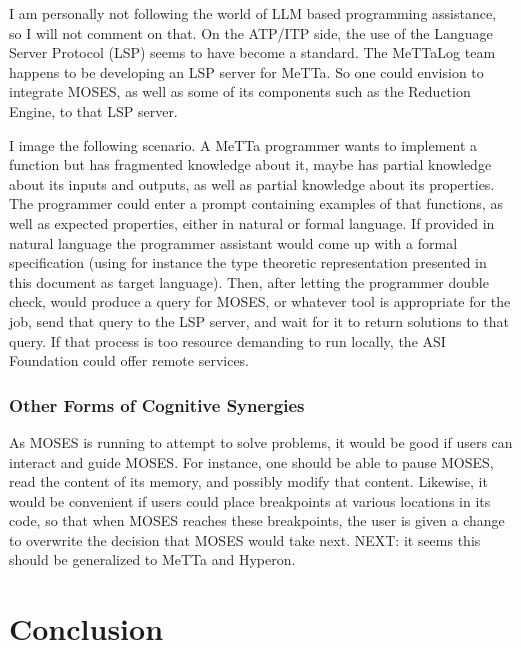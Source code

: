 \documentclass[]{report}
\begin{document}
I am personally not following the world of LLM based programming
assistance, so I will not comment on that.  On the ATP/ITP side, the
use of the Language Server Protocol (LSP) seems to have become a
standard.  The MeTTaLog team happens to be developing an LSP server
for MeTTa.  So one could envision to integrate MOSES, as well as some
of its components such as the Reduction Engine, to that LSP server.

I image the following scenario.  A MeTTa programmer wants to implement
a function but has fragmented knowledge about it, maybe has partial
knowledge about its inputs and outputs, as well as partial knowledge
about its properties.  The programmer could enter a prompt containing
examples of that functions, as well as expected properties, either in
natural or formal language.  If provided in natural language the
programmer assistant would come up with a formal specification (using
for instance the type theoretic representation presented in this
document as target language).  Then, after letting the programmer
double check, would produce a query for MOSES, or whatever tool is
appropriate for the job, send that query to the LSP server, and wait
for it to return solutions to that query.  If that process is too
resource demanding to run locally, the ASI Foundation could offer
remote services.

\subsection{Other Forms of Cognitive Synergies}

As MOSES is running to attempt to solve problems, it would be good if
users can interact and guide MOSES.  For instance, one should be able
to pause MOSES, read the content of its memory, and possibly modify
that content.  Likewise, it would be convenient if users could place
breakpoints at various locations in its code, so that when MOSES
reaches these breakpoints, the user is given a change to overwrite the
decision that MOSES would take next.  NEXT: it seems this should be
generalized to MeTTa and Hyperon.

\chapter{Conclusion}

 
\end{document}
